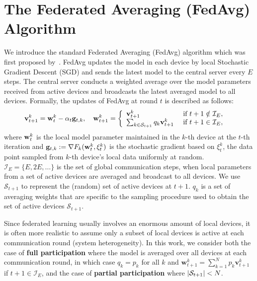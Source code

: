 
\section{The Federated Averaging (FedAvg) Algorithm}
We introduce the standard Federated Averaging (FedAvg) algorithm which was first proposed by~\cite{mcmahan2016communication}.
FedAvg updates the model in each device by local Stochastic Gradient Descent (SGD) and sends the latest model to the central server every $E$
steps. The central server conducts a weighted average over the model parameters
received from active devices and broadcasts the latest averaged model to all devices.
Formally, the updates of FedAvg at round $t$ is described as follows:
\begin{align}
\label{eq:fedavg updates}
{\mathbf{v}}_{t+1}^{k} & ={\mathbf{w}}_{t}^{k}-\alpha_{t}{\mathbf{g}}_{t,k}, \hspace{1em}
\mathbf{w}_{t+1}^{k} =\left\{
\begin{array}{ll}
\mathbf{v}_{t+1}^{k} & \text { if } t+1 \notin \mathcal{I}_{E}, \\ 
\sum_{k \in {\mathcal{S}}_{t+1}} q_k \mathbf{v}_{t+1}^{k} & \text { if } t+1 \in \mathcal{I}_{E},
\end{array}\right.
\end{align}
where ${\mathbf{w}}_t^k$ is the local model parameter maintained in the $k$-th device at the $t$-th iteration and ${\mathbf{g}}_{t,k}:=\nabla F_{k}({\mathbf{w}}_{t}^{k},\xi_{t}^{k})$ is the stochastic gradient based on $\xi_{t}^{k}$, the data point sampled from $k$-th device’s local data uniformly at random. $\mathcal{I}_{E}=\{E,2E,\dots\}$ is the set of global communication steps, when local parameters from a set of active devices are averaged and broadcast to all devices. We use $\mathcal{S}_{t+1}$ to represent the (random) set of active devices at $t+1$. $q_k$ is a set of averaging weights that are specific to the sampling procedure used to obtain the set of active devices $\mathcal{S}_{t+1}$.

Since federated learning usually involves an enormous amount of 
local devices, it is often more realistic to assume only a subset of 
local devices is active at each communication round (system heterogeneity). In this work,
we consider both the case of \textbf{full participation} where the model is
averaged over all devices at each communication round, in which case $q_k=p_k$ for all $k$ and 
$\mathbf{w}_{t+1}^{k} = \sum_{k=1}^N p_k \mathbf{v}_{t+1}^{k}$ if $t+1 \in \mathcal{I}_{E}$, and
the case of \textbf{partial participation} where $|{\mathcal{S}}_{t+1}| < N$. 

